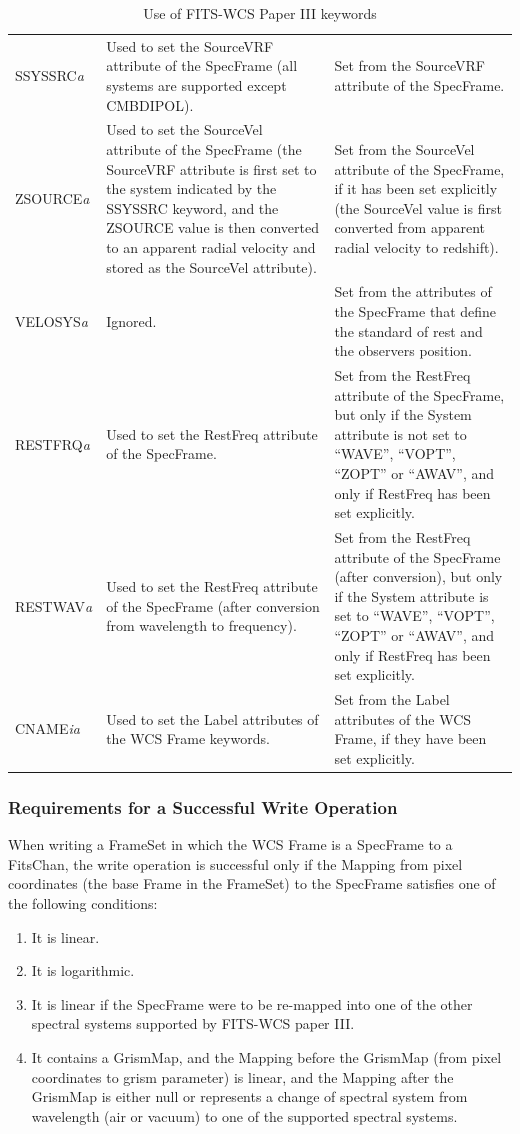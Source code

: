 \documentclass[twoside,11pt]{article}
\newcommand{\fitskey}[3]{{#1}&{#2}&{#3}\\}
\begin{document}
\begin{table}[htbp]
\begin{tabular}{|l|p{2.5in}|p{2.5in}|}
\fitskey{SSYSSRC\emph{a}}{Used to set the SourceVRF attribute of the
SpecFrame 
(all systems are supported except CMBDIPOL).} {Set from the SourceVRF 
attribute of the SpecFrame.}

\fitskey{ZSOURCE\emph{a}}{Used to set the SourceVel
attribute of the SpecFrame (the SourceVRF attribute
is first set to the system indicated by the SSYSSRC keyword, and the 
ZSOURCE value is then converted to an apparent radial velocity and stored
as the SourceVel attribute).}
{Set from the SourceVel attribute of
the SpecFrame, if it has been set explicitly (the SourceVel value is
first converted from apparent radial velocity to redshift).}

\fitskey{VELOSYS\emph{a}}{Ignored.}{Set from the attributes of the
SpecFrame that define the standard of rest and the observers position.}

\fitskey{RESTFRQ\emph{a}}{Used to set the RestFreq
attribute of the SpecFrame.}{Set from the RestFreq attribute of the
SpecFrame, but only if the System attribute is not set to 
``WAVE'', ``VOPT'', ``ZOPT'' or ``AWAV'', and only if RestFreq has been set 
explicitly.}

\fitskey{RESTWAV\emph{a}}{Used to set the RestFreq
attribute of the SpecFrame (after conversion from wavelength to frequency).}
{Set from the RestFreq attribute of the SpecFrame (after conversion), but only if the 
System attribute is set to ``WAVE'', ``VOPT'', ``ZOPT'' or 
``AWAV'', and only if RestFreq has been set explicitly.}

\fitskey{CNAME\emph{ia}}{Used to set the Label attributes of 
the WCS Frame keywords.}{Set from the Label attributes of the WCS Frame,
if they have been set explicitly.}
\hline
\end{tabular}
\vspace{3.mm}
\caption{Use of FITS-WCS Paper III keywords}
\label{tab:fitspaper3}
\end{table}

\subsubsection{Requirements for a Successful Write Operation}
When writing a FrameSet in which the WCS Frame is a SpecFrame to a 
FitsChan, the write operation is successful only if
the Mapping from pixel coordinates (the base Frame 
in the FrameSet) to the SpecFrame satisfies one of the following conditions:

\begin{enumerate}
\item It is linear.
\item It is logarithmic.
\item It is linear if the SpecFrame were to be re-mapped into one of the
other spectral systems supported by FITS-WCS paper III.
\item It contains a GrismMap, and the Mapping before the GrismMap (from
pixel coordinates to grism parameter) is linear, and the Mapping after the 
GrismMap is either null or represents a change of spectral system from wavelength (air or
vacuum) to one of the supported spectral systems.
\end{enumerate}
\end{document}
